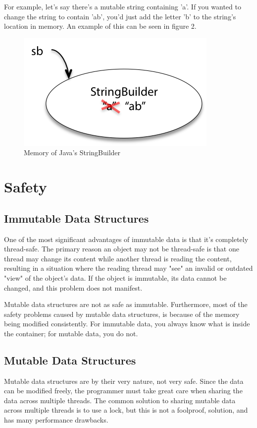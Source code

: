 \documentclass[11pt]{article}
\begin{document}
For example, let's say there's a mutable string containing 'a'. If you wanted
to change the string to contain 'ab', you'd just add the letter 'b' to the
string's location in memory. An example of this can be seen in figure 2.

\begin{figure}[H]
\centering

\includegraphics{string_builder}
\caption{Memory of Java's StringBuilder \cite{mit_reading_9}}

\end{figure}
\clearpage

\section{Safety}
\subsection{Immutable Data Structures}
One of the most significant advantages of immutable data is that it’s
completely thread-safe. The primary reason an object may not be thread-safe is
that one thread may change its content while another thread is reading the
content, resulting in a situation where the reading thread may "see" an invalid
or outdated "view" of the object's data. If the object is immutable, its data
cannot be changed, and this problem does not manifest.

Mutable data structures are not as safe as immutable. Furthermore, most of the
safety problems caused by mutable data structures, is because of the memory
being modified consistently. For immutable data, you always know what is inside
the container; for mutable data, you do not.

\subsection{Mutable Data Structures}
Mutable data structures are by their very nature, not very safe. Since the data
can be modified freely, the programmer must take great care when sharing the
data across multiple threads. The common solution to sharing mutable data
across multiple threads is to use a lock, but this is not a foolproof,
solution, and has many performance drawbacks.
\end{document}
